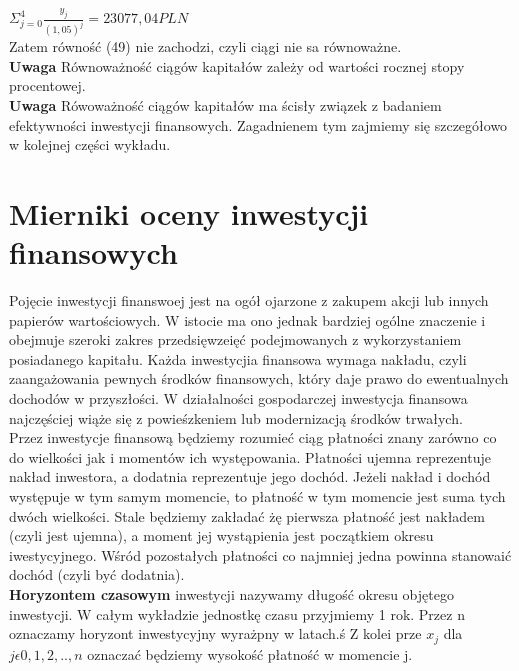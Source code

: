 \documentclass{article}
\begin{document}
$ \Sigma ^4_{j=0} \frac{y_j}{(1,05)^j} = 23 077,04 PLN $ \\

Zatem równość (49) nie zachodzi, czyli ciągi nie sa równoważne.\\

\textbf{Uwaga} Równoważność ciągów kapitałów zależy od wartości rocznej stopy procentowej.\\

\textbf{Uwaga} Rówoważność ciągów kapitałów ma ścisły związek z badaniem efektywności inwestycji finansowych. Zagadnienem tym zajmiemy się szczegółowo w kolejnej części wykładu.\\

\newpage

\section{Mierniki oceny inwestycji finansowych}

Pojęcie inwestycji finanswoej jest na ogół ojarzone z zakupem akcji lub innych papierów wartościowych. W istocie ma ono jednak bardziej ogólne znaczenie i obejmuje szeroki zakres przedsięwzeięć podejmowanych z wykorzystaniem posiadanego kapitału. Każda inwestycjia finansowa wymaga nakładu, czyli zaangażowania pewnych środków finansowych, który daje prawo do ewentualnych dochodów w przyszłości. W działalności gospodarczej inwestycja finansowa najczęściej wiąże się z powieśzkeniem lub modernizacją środków trwałych.\\

Przez inwestycje finansową będziemy rozumieć ciąg płatności znany zarówno co do wielkości jak i momentów ich występowania. Płatności ujemna reprezentuje nakład inwestora, a dodatnia reprezentuje jego dochód. Jeżeli nakład i dochód występuje w tym samym momencie, to płatność w tym momencie jest suma tych dwóch wielkości. Stale będziemy zakładać żę pierwsza płatność jest nakładem (czyli jest ujemna), a moment jej wystąpienia jest początkiem okresu iwestycyjnego. Wśród pozostałych płatności co najmniej jedna powinna stanowaić dochód (czyli być dodatnia).\\

\textbf{Horyzontem czasowym} inwestycji nazywamy długość okresu objętego inwestycji. W całym wykładzie jednostkę czasu przyjmiemy 1 rok. Przez n oznaczamy horyzont inwestycyjny wyrażpny w latach.ś Z kolei prze $ x_j $ dla $ j \epsilon {0,1,2,..,n} $ oznaczać będziemy wysokość płatność w momencie j.
\end{document}

